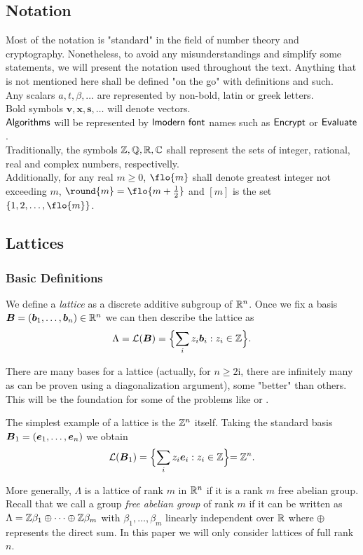\subsection{Notation}
Most of the notation is "standard" in the field of number theory and cryptography. Nonetheless, to avoid any misunderstandings and simplify some statements, we will present the notation used throughout the text. Anything that is not mentioned here shall be defined "on the go" with definitions and such. \\

\noindent Any scalars $a, t, \beta, \dots$ are represented by non-bold, latin or greek letters.\\
Bold symbols $\bm{v}, \bm{x}, \bm{s}, \dots$ will denote vectors. \\
$\alg{Algorithms}$ will be represented by $\alg{lmodern font}$ names such as $\alg{Encrypt}$ or $\alg{Evaluate}$.\\
Traditionally, the symbols $\mathbb{Z}, \mathbb{Q}, \mathbb{R}, \mathbb{C}$ shall represent the sets of integer, rational, real and complex numbers, respectivelly.\\
Additionally, for any real $m \geq 0$, $\flo{m}$ shall denote greatest integer not exceeding $m$, $\round{m} = \flo{m + \frac{1}{2}}$ and $[m]$ is the set $\{1, 2, \dots, \flo{m}\}$.
\subsection{Lattices}
\subsubsection*{Basic Definitions}
We define a \textit{lattice} as a discrete additive subgroup of $\mathbb{R}^n$. Once we fix a basis $\boldsymbol{B} = (\boldsymbol{b}_1, \dots ,\boldsymbol{b}_n) \in \mathbb{R}^n$ we can then describe the lattice as
$$ \Lambda = \mathcal{L}(\boldsymbol{B}) = \Bigl\{ \sum_i z_i \boldsymbol{b}_i : z_i \in \mathbb{Z} \Bigl\}.$$

There are many bases for a lattice (actually, for $n \geq 2$i, there are infinitely many as can be proven using a diagonalization argument), some "better" than others. This will be the foundation for some of the problems like  or .

\begin{example}
    The simplest example of a lattice is the $\mathbb{Z}^n$ itself. Taking the standard basis $\boldsymbol{B}_1 = (\boldsymbol{e}_1, \dots, \boldsymbol{e}_n)$ we obtain
$$\mathcal{L}(\boldsymbol{B}_1) = \Bigl\{ \sum_i z_i \boldsymbol{e}_i : z_i \in \mathbb{Z} \Bigl\} = \mathbb{Z}^n.$$
\end{example}
More generally, $\Lambda$ is a lattice of rank $m$ in $\mathbb{R}^n$ if it is a rank $m$ free abelian group. Recall that we call a group \textit{free abelian group} of rank $m$ if it can be written as $\Lambda = \mathbb{Z}\beta_1 \oplus \cdots \oplus\mathbb{Z}\beta_m$ with $\beta_1, \dots, \beta_m$ linearly independent over $\mathbb{R}$ where $\oplus$ represents the direct sum. In this paper we will only consider lattices of full rank $n$. 

